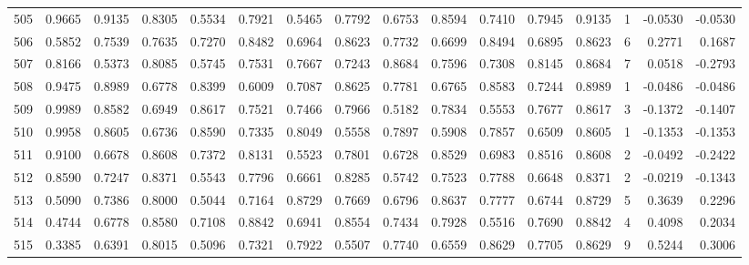 \begin{tabular}{lrrrrrrrrrrrrrrr}
505 &      0.9665 &  0.9135 &  0.8305 &  0.5534 &  0.7921 &  0.5465 &  0.7792 &  0.6753 &  0.8594 &  0.7410 &   0.7945 &     0.9135 &      1 &                   -0.0530 &                    -0.0530 \\
506 &      0.5852 &  0.7539 &  0.7635 &  0.7270 &  0.8482 &  0.6964 &  0.8623 &  0.7732 &  0.6699 &  0.8494 &   0.6895 &     0.8623 &      6 &                    0.2771 &                     0.1687 \\
507 &      0.8166 &  0.5373 &  0.8085 &  0.5745 &  0.7531 &  0.7667 &  0.7243 &  0.8684 &  0.7596 &  0.7308 &   0.8145 &     0.8684 &      7 &                    0.0518 &                    -0.2793 \\
508 &      0.9475 &  0.8989 &  0.6778 &  0.8399 &  0.6009 &  0.7087 &  0.8625 &  0.7781 &  0.6765 &  0.8583 &   0.7244 &     0.8989 &      1 &                   -0.0486 &                    -0.0486 \\
509 &      0.9989 &  0.8582 &  0.6949 &  0.8617 &  0.7521 &  0.7466 &  0.7966 &  0.5182 &  0.7834 &  0.5553 &   0.7677 &     0.8617 &      3 &                   -0.1372 &                    -0.1407 \\
510 &      0.9958 &  0.8605 &  0.6736 &  0.8590 &  0.7335 &  0.8049 &  0.5558 &  0.7897 &  0.5908 &  0.7857 &   0.6509 &     0.8605 &      1 &                   -0.1353 &                    -0.1353 \\
511 &      0.9100 &  0.6678 &  0.8608 &  0.7372 &  0.8131 &  0.5523 &  0.7801 &  0.6728 &  0.8529 &  0.6983 &   0.8516 &     0.8608 &      2 &                   -0.0492 &                    -0.2422 \\
512 &      0.8590 &  0.7247 &  0.8371 &  0.5543 &  0.7796 &  0.6661 &  0.8285 &  0.5742 &  0.7523 &  0.7788 &   0.6648 &     0.8371 &      2 &                   -0.0219 &                    -0.1343 \\
513 &      0.5090 &  0.7386 &  0.8000 &  0.5044 &  0.7164 &  0.8729 &  0.7669 &  0.6796 &  0.8637 &  0.7777 &   0.6744 &     0.8729 &      5 &                    0.3639 &                     0.2296 \\
514 &      0.4744 &  0.6778 &  0.8580 &  0.7108 &  0.8842 &  0.6941 &  0.8554 &  0.7434 &  0.7928 &  0.5516 &   0.7690 &     0.8842 &      4 &                    0.4098 &                     0.2034 \\
515 &      0.3385 &  0.6391 &  0.8015 &  0.5096 &  0.7321 &  0.7922 &  0.5507 &  0.7740 &  0.6559 &  0.8629 &   0.7705 &     0.8629 &      9 &                    0.5244 &                     0.3006 \\

\end{tabular}
